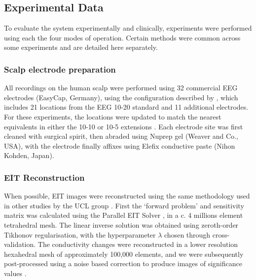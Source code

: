 \subsection{Experimental Data}

To evaluate the system experimentally and clinically, experiments were performed using each the four modes of operation. Certain methods were common across some experiments and are detailed here separately. 

\subsubsection{Scalp electrode preparation}
All recordings on the human scalp were performed using 32 commercial EEG electrodes (EasyCap, Germany), using the configuration described by \citet{tidswell2001three}, which includes 21 locations from the EEG 10-20 standard \cite{Jasper1958} and 11 additional electrodes. For these experiments, the locations were updated to match the nearest equivalents in either the 10-10 or 10-5 extensions \cite{Oostenveld2001}. Each electrode site was first cleaned with surgical spirit, then abraded using Nuprep gel (Weaver and Co., USA), with the electrode finally affixes using Elefix conductive paste (Nihon Kohden, Japan). 

\subsubsection{EIT Reconstruction}
When possible, EIT images were reconstructed using the same methodology used in other studies by the UCL group \cite{Dowrick_2016,Aristovich_2016,Aristovich_2014}. First the `forward problem' and sensitivity matrix was calculated using the Parallel EIT Solver \cite{Jehl2014}, in a c. 4 millions element tetrahedral mesh. The linear inverse solution was obtained using zeroth-order Tikhonov regularisation, with the hyperparameter $\lambda$ chosen through cross-validation.  The conductivity changes were reconstructed in a lower resolution hexahedral mesh of approximately 100,000 elements, and we were subsequently post-processed using a noise based correction to produce images of significance values \cite{Aristovich_2016}.